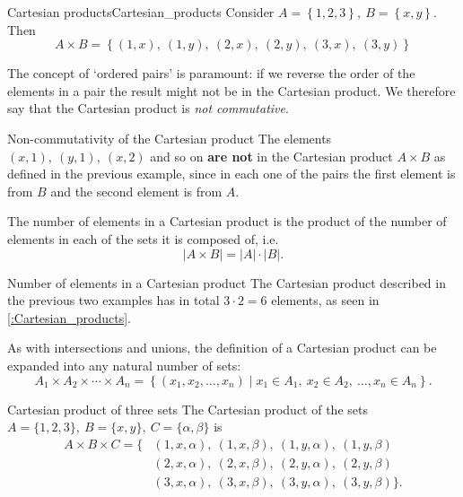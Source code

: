 \begin{example}{Cartesian products}{Cartesian_products}
	Consider $A=\left\{ 1,2,3 \right\},\ B=\left\{ x, y \right\}$. Then
	\[
		A\times B = \left\{ \left( 1,x \right),\ \left( 1,y \right),\ \left( 2,x \right),\ \left( 2,y \right),\ \left( 3,x \right),\ \left( 3,y \right) \right\}
	\]
\end{example}

The concept of `ordered pairs' is paramount: if we reverse the order of the elements in a pair the result might not be in the Cartesian product. We therefore say that the Cartesian product is \emph{not commutative}.

\begin{example}{Non-commutativity of the Cartesian product}{}
	The elements $(x,1),\ (y,1),\ (x,2)$ and so on \textbf{are not} in the Cartesian product $A\times B$ as defined in the previous example, since in each one of the pairs the first element is from $B$ and the second element is from $A$.
\end{example}

The number of elements in a Cartesian product is the product of the number of elements in each of the sets it is composed of, i.e.
\begin{equation}
	|A\times B| = |A|\cdot|B|.
	\label{eq:number_of_elements_Cartesian_product}
\end{equation}

\begin{example}{Number of elements in a Cartesian product}{}
	The Cartesian product described in the previous two examples has in total $3\cdot2=6$ elements, as seen in \autoref{:Cartesian_products}.
\end{example}

As with intersections and unions, the definition of a Cartesian product can be expanded into any natural number of sets:
\begin{equation}
	A_{1}\times A_{2}\times \cdots \times A_{n} = \left\{ \left( x_{1},x_{2},\dots,x_{n} \right) \mid x_{1}\in A_{1},\ x_{2}\in A_{2},\ \dots, x_{n}\in A_{n} \right\}.
	\label{eq:Cartesian_product_multiple_sets}
\end{equation}

\begin{example}{Cartesian product of three sets}{}
	The Cartesian product of the sets $A=\{1,2,3\},\ B=\{x,y\},\ C=\{\alpha,\beta\}$ is
	\begin{align*}
		A\times B\times C = \{
			&(1,x,\alpha),\ (1,x,\beta),\ (1,y,\alpha),\ (1,y,\beta)\\
			&(2,x,\alpha),\ (2,x,\beta),\ (2,y,\alpha),\ (2,y,\beta)\\
			&(3,x,\alpha),\ (3,x,\beta),\ (3,y,\alpha),\ (3,y,\beta)
		\}.
	\end{align*}
\end{example}

